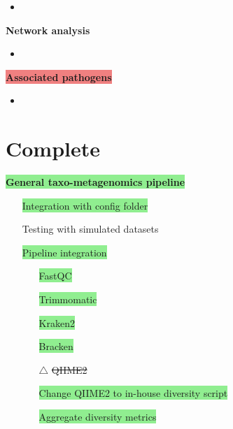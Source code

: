 \documentclass[11pt]{article}
\newcommand{\done}{\checkmark}  %
\newcommand{\issue}{$\triangle$}  %
\newcommand{\highlightessential}[1]{\colorbox{lightgreen}{#1}}  %
\newcommand{\highlightoptional}[1]{\colorbox{lightorange}{#1}}  %
\newcommand{\highlightrobust}[1]{\colorbox{lightcoral}{#1}}  %
\newcommand{\deprecated}[1]{\sout{#1}}  %
\begin{document}
	\begin{itemize}
		\item 
	\end{itemize}
\par\noindent\hspace{1cm}\highlightoptional{\textbf{\large Network analysis}}  %
	\begin{itemize}
		\item 
	\end{itemize}
\par\noindent\hspace{1cm}\highlightrobust{\textbf{\large Associated pathogens}}  %
	\begin{itemize}
		\item 
	\end{itemize}
	
\section{Complete} 


\par\noindent\highlightessential{\textbf{\large General taxo-metagenomics pipeline}}
	\begin{itemize}
		\item [\done] \highlightessential{Integration with config folder}
		\item [\done] \highlightoptional{Testing with simulated datasets}
		\item [\done] \highlightessential{Pipeline integration}
			\begin{itemize}
				\item [\done] \highlightessential{FastQC}
				\item [\done] \highlightessential{Trimmomatic}
				\item [\done] \highlightessential{Kraken2}
				\item [\done] \highlightessential{Bracken}
				\item [\issue] \deprecated{QIIME2}
				\item [\done] \highlightessential{Change QIIME2 to in-house diversity script}
				\item [\done] \highlightessential{Aggregate diversity metrics}
			\end{itemize}
	\end{itemize}
\end{document}
